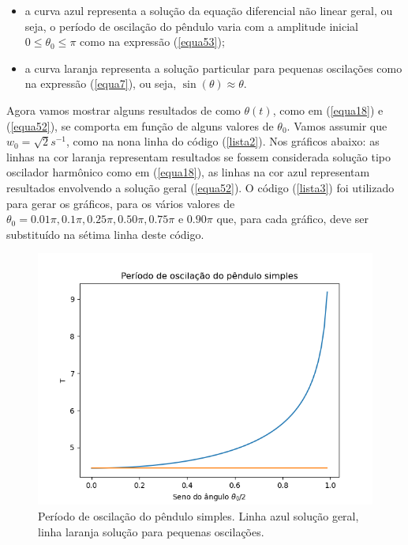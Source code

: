 \documentclass[12pt,openright,twoside,english,brazil]{abntex2}
\begin{document}
\begin{itemize}
 \item a curva azul representa a solução da equação diferencial não linear geral, ou seja, o período de oscilação do pêndulo varia com a amplitude inicial $0 \leq \theta_0 \leq \pi$ como na expressão (\ref{equa53});
 \item a curva laranja representa a solução particular para pequenas oscilações como na expressão (\ref{equa7}), ou seja, $\sin{(\theta)} \approx \theta$. 
\end{itemize}

Agora vamos mostrar alguns resultados de como $\theta(t)$, como em (\ref{equa18}) e (\ref{equa52}), se comporta em função de alguns valores de $\theta_0$. Vamos assumir que $w_0=\sqrt{2}s^{-1}$, como na nona linha do código (\ref{lista2}). Nos gráficos abaixo: as linhas na cor laranja representam resultados se fossem considerada solução tipo oscilador harmônico como em  (\ref{equa18}), as linhas na cor azul representam resultados envolvendo a solução geral (\ref{equa52}). O código (\ref{lista3}) foi utilizado para gerar os gráficos, para os vários valores de $\theta_0 = 0.01\pi, 0.1\pi, 0.25\pi, 0.50\pi, 0.75\pi \, \, \mbox{e} \, \, 0.90\pi$ que, para cada gráfico, deve ser substituído na sétima linha deste  código.

\begin{figure}
 \begin{center}
  \includegraphics[scale=0.5]{Periodo.png}
 \end{center}
 \caption{Período de oscilação do pêndulo simples. Linha azul solução geral, linha laranja solução para pequenas oscilações.}
 \label{Figura4}
\end{figure}
\end{document}

